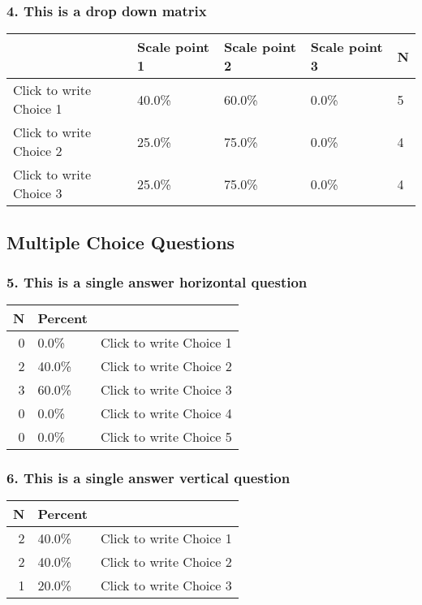 \documentclass{article}\usepackage[]{graphicx}\usepackage[]{color}
\begin{document}
\hfill \break \hfill \break
\subsubsection*{4.
This is a drop down matrix}

\begin{tabular}{l|l|l|l|l}
\hline
 & Scale point 1 & Scale point 2 & Scale point 3 & N\\
\hline
Click to write Choice 1 & 40.0\% & 60.0\% & 0.0\% & 5\\
\hline
Click to write Choice 2 & 25.0\% & 75.0\% & 0.0\% & 4\\
\hline
Click to write Choice 3 & 25.0\% & 75.0\% & 0.0\% & 4\\
\hline
\end{tabular}


\hfill \break \hfill \break
\subsection*{Multiple Choice Questions}
\subsubsection*{5.
This is a single answer horizontal question}

\begin{tabular}{r|l|l}
\hline
N & Percent & \\
\hline
0 & 0.0\% & Click to write Choice 1\\
\hline
2 & 40.0\% & Click to write Choice 2\\
\hline
3 & 60.0\% & Click to write Choice 3\\
\hline
0 & 0.0\% & Click to write Choice 4\\
\hline
0 & 0.0\% & Click to write Choice 5\\
\hline
\end{tabular}


\hfill \break \hfill \break
\subsubsection*{6.
This is a single answer vertical question}

\begin{tabular}{r|l|l}
\hline
N & Percent & \\
\hline
2 & 40.0\% & Click to write Choice 1\\
\hline
2 & 40.0\% & Click to write Choice 2\\
\hline
1 & 20.0\% & Click to write Choice 3\\
\hline
\end{tabular}
\end{document}

